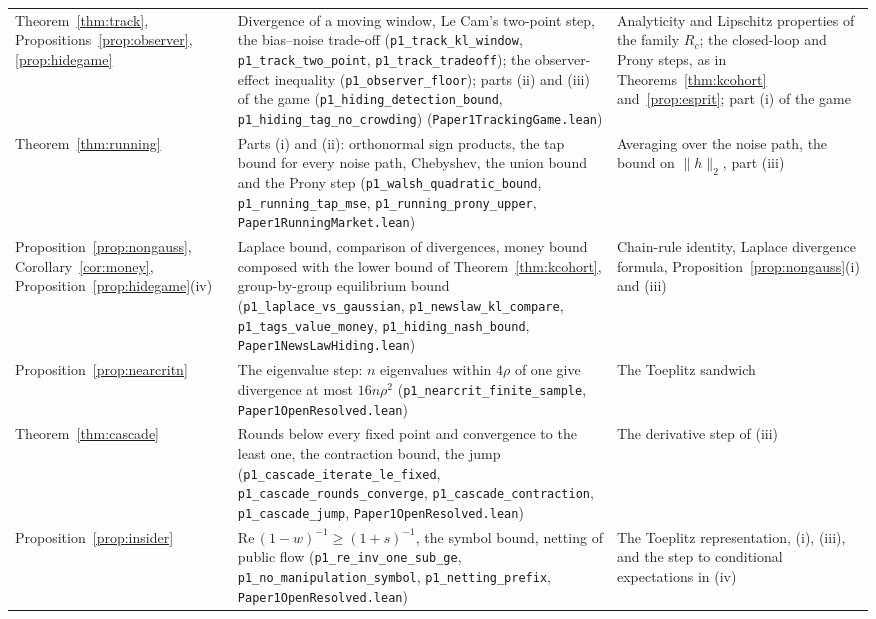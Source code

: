 \begin{longtable}{>{\raggedright\arraybackslash}p{}>{\raggedright\arraybackslash}p{}>{\raggedright\arraybackslash}p{}}
Theorem~\ref{thm:track}, Propositions~\ref{prop:observer}, \ref{prop:hidegame} & Divergence of a moving window, Le Cam's two-point step, the bias--noise trade-off (\texttt{p1\_track\_kl\_window}, \texttt{p1\_track\_two\_point}, \texttt{p1\_track\_tradeoff}); the observer-effect inequality (\texttt{p1\_observer\_floor}); parts (ii) and (iii) of the game (\texttt{p1\_hiding\_detection\_bound}, \texttt{p1\_hiding\_tag\_no\_crowding}) (\nolinkurl{Paper1TrackingGame.lean}) & Analyticity and Lipschitz properties of the family $R_c$; the closed-loop and Prony steps, as in Theorems~\ref{thm:kcohort} and~\ref{prop:esprit}; part (i) of the game\\
Theorem~\ref{thm:running} & Parts (i) and (ii): orthonormal sign products, the tap bound for every noise path, Chebyshev, the union bound and the Prony step (\texttt{p1\_walsh\_quadratic\_bound}, \texttt{p1\_running\_tap\_mse}, \texttt{p1\_running\_prony\_upper}, \nolinkurl{Paper1RunningMarket.lean}) & Averaging over the noise path, the bound on $\|h\|_2$, part (iii)\\
Proposition~\ref{prop:nongauss}, Corollary~\ref{cor:money}, Proposition~\ref{prop:hidegame}(iv) & Laplace bound, comparison of divergences, money bound composed with the lower bound of Theorem~\ref{thm:kcohort}, group-by-group equilibrium bound (\texttt{p1\_laplace\_vs\_gaussian}, \texttt{p1\_newslaw\_kl\_compare}, \texttt{p1\_tags\_value\_money}, \texttt{p1\_hiding\_nash\_bound}, \nolinkurl{Paper1NewsLawHiding.lean}) & Chain-rule identity, Laplace divergence formula, Proposition~\ref{prop:nongauss}(i) and (iii)\\
Proposition~\ref{prop:nearcritn} & The eigenvalue step: $n$ eigenvalues within $4\rho$ of one give divergence at most $16n\rho^2$ (\texttt{p1\_nearcrit\_finite\_sample}, \nolinkurl{Paper1OpenResolved.lean}) & The Toeplitz sandwich\\
Theorem~\ref{thm:cascade} & Rounds below every fixed point and convergence to the least one, the contraction bound, the jump (\texttt{p1\_cascade\_iterate\_le\_fixed}, \texttt{p1\_cascade\_rounds\_converge}, \texttt{p1\_cascade\_contraction}, \texttt{p1\_cascade\_jump}, \nolinkurl{Paper1OpenResolved.lean}) & The derivative step of (iii)\\
Proposition~\ref{prop:insider} & $\mathrm{Re}\,(1-w)^{-1}\ge(1+s)^{-1}$, the symbol bound, netting of public flow (\texttt{p1\_re\_inv\_one\_sub\_ge}, \texttt{p1\_no\_manipulation\_symbol}, \texttt{p1\_netting\_prefix}, \nolinkurl{Paper1OpenResolved.lean}) & The Toeplitz representation, (i), (iii), and the step to conditional expectations in (iv)\\

\end{longtable}
